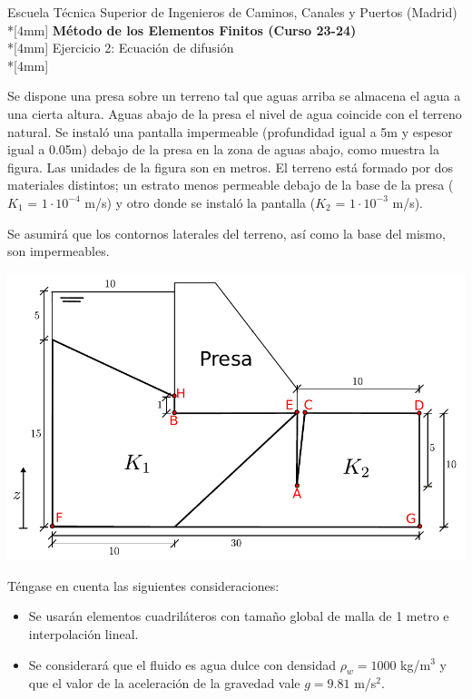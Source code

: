 \documentclass[a4paper,12pt]{article}
\begin{document}
\mbox{}\vspace*{-45mm}

{\centering
{\small\sc Escuela Técnica Superior de Ingenieros de Caminos, Canales y
Puertos (Madrid)}\\*[4mm]
{\Large\bf Método de los Elementos Finitos (Curso 23-24)}\\*[4mm]
Ejercicio 2: Ecuación de difusión \\*[4mm]
}

\vspace{3mm}

\noindent

Se dispone una presa sobre un terreno tal que aguas arriba se almacena el agua a una cierta altura. Aguas abajo de la presa el nivel de agua coincide con el terreno natural. Se instaló una pantalla impermeable (profundidad igual a 5m y espesor igual a 0.05m) debajo de la presa en la zona de aguas abajo, como muestra la figura. Las unidades de la figura son en metros.   
El terreno está formado por dos materiales distintos; un estrato menos permeable debajo de la base de la presa ($K_1$ = $1\cdot 10^{-4}$ m/s) y otro donde se instaló la pantalla ($K_2$ = $1\cdot 10^{-3}$ m/s).

Se asumirá que los contornos laterales del terreno, así como la base del mismo, son impermeables.


\vspace{0.4cm}

\begin{center}
\includegraphics[width=1\textwidth]{Ejer2._2023-cropped.pdf}
\end{center}
\vspace{0.4cm}

Téngase en cuenta las siguientes consideraciones:

\begin{itemize}
\item Se usarán elementos cuadriláteros con tamaño global de malla de 1 metro e
  interpolación lineal. 
\item Se considerará que el fluido es agua dulce con densidad $\rho_w=1000$
  kg/m$^3$ y que el valor de la aceleración de la gravedad vale $g=9.81$ m/s$^2$.

\end{itemize}
\end{document}
